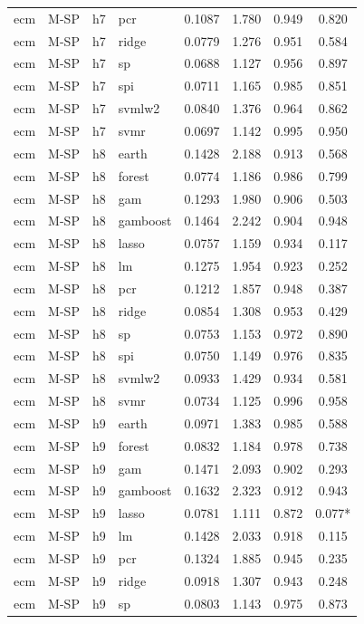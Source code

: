 \begin{ThreePartTable}
\begin{longtable}[t]{llclcccc}
ecm & M-SP & h7 & pcr & 0.1087 & 1.780 & 0.949 & 0.820\\
ecm & M-SP & h7 & ridge & 0.0779 & 1.276 & 0.951 & 0.584\\
ecm & M-SP & h7 & sp & 0.0688 & 1.127 & 0.956 & 0.897\\
ecm & M-SP & h7 & spi & 0.0711 & 1.165 & 0.985 & 0.851\\
ecm & M-SP & h7 & svmlw2 & 0.0840 & 1.376 & 0.964 & 0.862\\
ecm & M-SP & h7 & svmr & 0.0697 & 1.142 & 0.995 & 0.950\\
\addlinespace
ecm & M-SP & h8 & earth & 0.1428 & 2.188 & 0.913 & 0.568\\
ecm & M-SP & h8 & forest & 0.0774 & 1.186 & 0.986 & 0.799\\
ecm & M-SP & h8 & gam & 0.1293 & 1.980 & 0.906 & 0.503\\
ecm & M-SP & h8 & gamboost & 0.1464 & 2.242 & 0.904 & 0.948\\
ecm & M-SP & h8 & lasso & 0.0757 & 1.159 & 0.934 & 0.117\\
ecm & M-SP & h8 & lm & 0.1275 & 1.954 & 0.923 & 0.252\\
ecm & M-SP & h8 & pcr & 0.1212 & 1.857 & 0.948 & 0.387\\
ecm & M-SP & h8 & ridge & 0.0854 & 1.308 & 0.953 & 0.429\\
ecm & M-SP & h8 & sp & 0.0753 & 1.153 & 0.972 & 0.890\\
ecm & M-SP & h8 & spi & 0.0750 & 1.149 & 0.976 & 0.835\\
ecm & M-SP & h8 & svmlw2 & 0.0933 & 1.429 & 0.934 & 0.581\\
ecm & M-SP & h8 & svmr & 0.0734 & 1.125 & 0.996 & 0.958\\
\addlinespace
ecm & M-SP & h9 & earth & 0.0971 & 1.383 & 0.985 & 0.588\\
ecm & M-SP & h9 & forest & 0.0832 & 1.184 & 0.978 & 0.738\\
ecm & M-SP & h9 & gam & 0.1471 & 2.093 & 0.902 & 0.293\\
ecm & M-SP & h9 & gamboost & 0.1632 & 2.323 & 0.912 & 0.943\\
ecm & M-SP & h9 & lasso & 0.0781 & 1.111 & 0.872 & 0.077*\\
ecm & M-SP & h9 & lm & 0.1428 & 2.033 & 0.918 & 0.115\\
ecm & M-SP & h9 & pcr & 0.1324 & 1.885 & 0.945 & 0.235\\
ecm & M-SP & h9 & ridge & 0.0918 & 1.307 & 0.943 & 0.248\\
ecm & M-SP & h9 & sp & 0.0803 & 1.143 & 0.975 & 0.873\\

\end{longtable}
\end{ThreePartTable}
